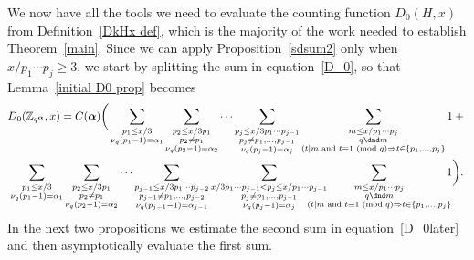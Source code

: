 \documentclass[12pt,reqno]{amsart}
\theoremstyle{definition}
\newcommand{\Z}{{\mathbb Z}}
\newcommand{\balpha}{{\bm\alpha}}
\renewcommand{\mod}[1]{{\ifmmode\text{\rm\ (mod~$#1$)}\else\discretionary{}{}{\hbox{ }}\rm(mod~$#1$)\fi}}
\begin{document}
We now have all the tools we need to evaluate the counting function $D_0(H,x)$ from Definition~\ref{DkHx def}, which is the majority of the work needed to establish Theorem~\ref{main}.
Since we can apply Proposition~\ref{sdsum2} only when $x/p_1\cdots p_j \ge 3$, we start by splitting the sum in equation~\eqref{D_0}, so that Lemma~\ref{initial D0 prop} becomes
\begin{multline} \label{D_0later}
D_0(\Z_{q^\balpha},x)= C(\balpha) \bigg( \sum_{\substack{p_1\le x/3\\ \nu_q(p_1-1)=\alpha_1}}\sum_{\substack{p_2\le x/3p_1\\p_2\ne p_1\\\nu_q(p_2-1)=\alpha_2}}\cdots \sum_{\substack{p_j\le x/3p_1\cdots p_{j-1}\\p_j\ne p_1,\ldots,p_{j-1}\\\nu_q(p_j-1)=\alpha_j}}\sum_{\substack{m\le x/p_1\cdots p_j\\q\dnd m\\ (t\mid m\text{ and }t\equiv1\mod q \Rightarrow t\in\{p_1,\dots,p_j\}}}1 +{} \\
\sum_{\substack{p_1\le x/3 \\ \nu_q(p_1-1)=\alpha_1}}\sum_{\substack{p_2\le x/3p_1\\p_2\ne p_1\\\nu_q(p_2-1)=\alpha_2}}\cdots \sum_{\substack{p_{j-1}\le x/3p_1\cdots p_{j-2} \\ p_{j-1}\ne p_1,\ldots,p_{j-2} \\ \nu_q(p_{j-1}-1)=\alpha_{j-1}}} \sum_{\substack{x/3p_1\cdots p_{j-1}<p_j\le x/p_1\cdots p_{j-1}\\p_j\ne p_1,\ldots,p_{j-1}\\\nu_q(p_j-1)=\alpha_j}} \hskip-7mm \sum_{\substack{m\le x/p_1\cdots p_j\\q\dnd m\\ (t\mid m\text{ and }t\equiv1\mod q \Rightarrow t\in\{p_1,\dots,p_j\}}} \hskip-2mm 1 \bigg).
\end{multline}
In the next two propositions we estimate the second sum in equation~\eqref{D_0later} and then asymptotically evaluate the first sum.
\end{document}
